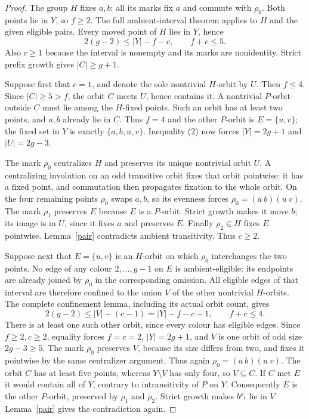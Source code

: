 \documentclass[11pt,a4paper]{article}
\begin{document}
\begin{proof}
The group $H$ fixes $a,b$: all its marks fix $a$ and commute
with $\rho_0$. Both points lie in $Y$, so $f\ge2$.
The full ambient-interval theorem applies to $H$ and the given
eligible pairs. Every moved point of $H$ lies in $Y$, hence
\[
          2(g-2)\le |Y|-f-c,\qquad f+c\le5.              \tag{2}
\]
Also $c\ge1$ because the interval is nonempty and its marks
are nonidentity. Strict prefix growth gives $|C|\ge g+1$.

Suppose first that $c=1$, and denote the sole nontrivial $H$-orbit
by $U$. Then $f\le4$. Since $|C|\ge5>f$, the orbit $C$
meets $U$, hence contains it. A nontrivial $P$-orbit outside
$C$ must lie among the $H$-fixed points. Such an orbit has at
least two points, and $a,b$ already lie in $C$. Thus $f=4$
and the other $P$-orbit is $E=\{u,v\}$; the fixed set in
$Y$ is exactly $\{a,b,u,v\}$. Inequality (2) now forces
$|Y|=2g+1$ and $|U|=2g-3$.

The mark $\rho_0$ centralizes $H$ and preserves its unique
nontrivial orbit $U$. A centralizing involution on an odd transitive
orbit fixes that orbit pointwise: it has a fixed point, and commutation
then propagates fixation to the whole orbit. On the four remaining
points $\rho_0$ swaps $a,b$, so its evenness forces
$\rho_0=(a\ b)(u\ v)$. The mark $\rho_1$ preserves $E$
because $E$ is a $P$-orbit. Strict growth makes it move $b$;
its image is in $U$, since it fixes $a$ and preserves $E$.
Finally $\rho_2\in H$ fixes $E$ pointwise. Lemma~\ref{pair}
contradicts ambient transitivity. Thus $c\ge2$.

Suppose next that $E=\{u,v\}$ is an $H$-orbit on which
$\rho_0$ interchanges the two points. No edge of any colour
$2,\ldots,g-1$ on $E$ is ambient-eligible: its endpoints
are already joined by $\rho_0$ in the corresponding omission.
All eligible edges of that interval are therefore confined to
the union $V$ of the other nontrivial $H$-orbits.
The complete confinement lemma, including its actual orbit count,
gives
\[
  2(g-2)\le |V|-(c-1)=|Y|-f-c-1,
                      \qquad f+c\le4.                  \tag{3}
\]
There is at least one such other orbit, since every colour has
eligible edges. Since $f\ge2,c\ge2$, equality forces
$f=c=2$, $|Y|=2g+1$, and $V$ is one orbit of odd size
$2g-3\ge5$. The mark $\rho_0$ preserves $V$, because
its size differs from two, and fixes it pointwise by the same
centralizer argument. Thus again $\rho_0=(a\ b)(u\ v)$.
The orbit $C$ has at least five points, whereas $Y\setminus V$
has only four, so $V\subseteq C$. If $C$ met $E$ it would
contain all of $Y$, contrary to intransitivity of $P$ on $Y$.
Consequently $E$ is the other $P$-orbit, preserved by
$\rho_1$ and $\rho_2$. Strict growth makes $b^{\rho_1}$
lie in $V$. Lemma~\ref{pair} gives the contradiction again.


\end{proof}
\end{document}
